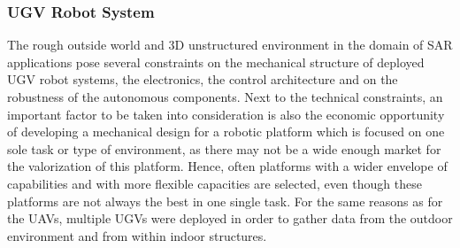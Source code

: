 \documentclass{article}
\begin{document}
\subsubsection{UGV Robot System}
The rough outside world and 3D unstructured environment in the domain of SAR applications pose several constraints on the mechanical structure of deployed UGV robot systems, the electronics, the control architecture and on the robustness of the autonomous components.
Next to the technical constraints, an important factor to be taken into consideration is also the economic opportunity of developing a mechanical design for a robotic platform which is focused on one sole task or type of environment, as there may not be a wide enough market for the valorization of this platform. Hence, often platforms with a wider envelope of capabilities and with more flexible capacities are selected, even though these platforms are not always the best in one single task.
For the same reasons as for the UAVs, multiple UGVs were deployed in order to gather data from the outdoor environment and from within indoor structures.
\end{document}
